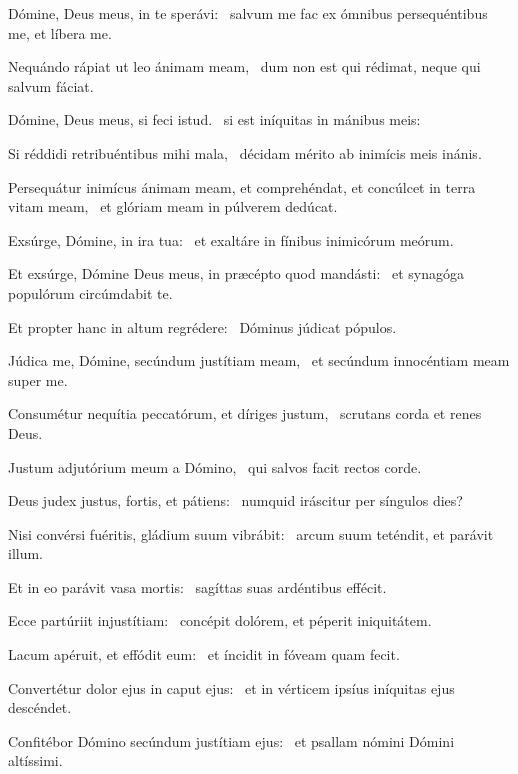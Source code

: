 \item Dómine, Deus meus, in te sperávi:~\psstar{} salvum me fac ex ómnibus persequéntibus me, et líbera me.

\item Nequándo rápiat ut leo ánimam meam,~\psstar{} dum non est qui rédimat, neque qui salvum fáciat.

\item Dómine, Deus meus, si feci istud.~\psstar{} si est iníquitas in mánibus meis:

\item Si réddidi retribuéntibus mihi mala,~\psstar{} décidam mérito ab inimícis meis inánis.

\item Persequátur inimícus ánimam meam, et comprehéndat, et concúlcet in terra vitam meam,~\psstar{} et glóriam meam in púlverem dedúcat.

\item Exsúrge, Dómine, in ira tua:~\psstar{} et exaltáre in fínibus inimicórum meórum.

\item Et exsúrge, Dómine Deus meus, in præcépto quod mandásti:~\psstar{} et synagóga populórum circúmdabit te.

\item Et propter hanc in altum regrédere:~\psstar{} Dóminus júdicat pópulos.

\item Júdica me, Dómine, secúndum justítiam meam,~\psstar{} et secúndum innocéntiam meam super me.

\item Consumétur nequítia peccatórum, et díriges justum,~\psstar{} scrutans corda et renes Deus.

\item Justum adjutórium meum a Dómino,~\psstar{} qui salvos facit rectos corde.

\item Deus judex justus, fortis, et pátiens:~\psstar{} numquid iráscitur per síngulos dies?

\item Nisi convérsi fuéritis, gládium suum vibrábit:~\psstar{} arcum suum teténdit, et parávit illum.

\item Et in eo parávit vasa mortis:~\psstar{} sagíttas suas ardéntibus effécit.

\item Ecce partúriit injustítiam:~\psstar{} concépit dolórem, et péperit iniquitátem.

\item Lacum apéruit, et effódit eum:~\psstar{} et íncidit in fóveam quam fecit.

\item Convertétur dolor ejus in caput ejus:~\psstar{} et in vérticem ipsíus iníquitas ejus descéndet.

\item Confitébor Dómino secúndum justítiam ejus:~\psstar{} et psallam nómini Dómini altíssimi.